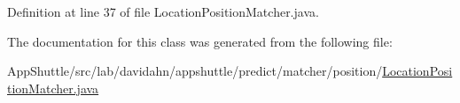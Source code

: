 \-Definition at line 37 of file \-Location\-Position\-Matcher.\-java.



\-The documentation for this class was generated from the following file\-:\begin{DoxyCompactItemize}
\item 
\-App\-Shuttle/src/lab/davidahn/appshuttle/predict/matcher/position/\hyperlink{_location_position_matcher_8java}{\-Location\-Position\-Matcher.\-java}\end{DoxyCompactItemize}
